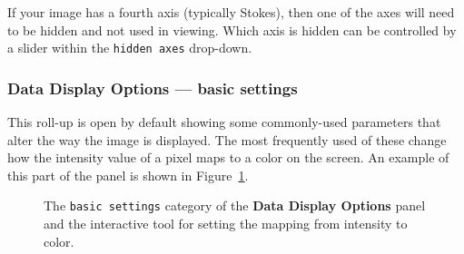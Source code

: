 If your image has a fourth axis (typically Stokes), then one of the axes
will need to be hidden and not used in viewing. Which axis is hidden 
can be controlled by a slider within the {\tt hidden axes} drop-down.

\subsubsection{Data Display Options --- basic settings}
\label{section:display.image.raster.adjust.basic}

This roll-up is open by default showing some commonly-used parameters
that alter the way the image is displayed. The most frequently used of these
change how the intensity value of a pixel maps to a color on 
the screen. An example of this part of the panel is shown in
Figure~\ref{fig:viewer_raster_basic}.

\begin{figure}[h!]
\begin{center}
\caption{\label{fig:viewer_raster_basic} The {\tt basic settings}
category of the {\bf Data Display Options} panel and the interactive
tool for setting the mapping from intensity to color.}
\hrulefill
\end{center}
\end{figure}

